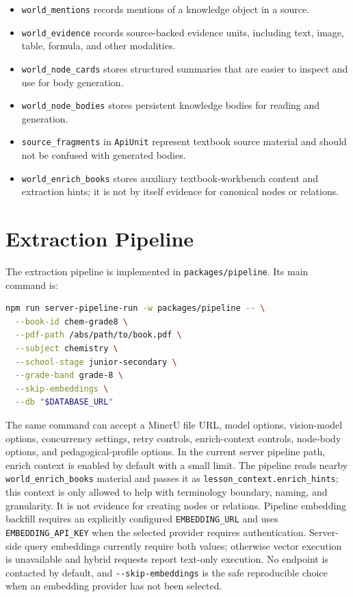 \documentclass[11pt,letterpaper]{article}
\newcommand{\code}[1]{\nolinkurl{#1}}
\begin{document}
\begin{itemize}
  \item \code{world_mentions} records mentions of a knowledge object in a source.
  \item \code{world_evidence} records source-backed evidence units, including text, image, table, formula, and other modalities.
  \item \code{world_node_cards} stores structured summaries that are easier to inspect and use for body generation.
  \item \code{world_node_bodies} stores persistent knowledge bodies for reading and generation.
  \item \code{source_fragments} in \code{ApiUnit} represent textbook source material and should not be confused with generated bodies.
  \item \code{world_enrich_books} stores auxiliary textbook-workbench content and extraction hints; it is not by itself evidence for canonical nodes or relations.
\end{itemize}

\section{Extraction Pipeline}

The extraction pipeline is implemented in \code{packages/pipeline}. Its main command is:

\begin{lstlisting}[language=bash]
npm run server-pipeline-run -w packages/pipeline -- \
  --book-id chem-grade8 \
  --pdf-path /abs/path/to/book.pdf \
  --subject chemistry \
  --school-stage junior-secondary \
  --grade-band grade-8 \
  --skip-embeddings \
  --db "$DATABASE_URL"
\end{lstlisting}

The same command can accept a MinerU file URL, model options, vision-model options, concurrency settings, retry controls, enrich-context controls, node-body options, and pedagogical-profile options. In the current server pipeline path, enrich context is enabled by default with a small limit. The pipeline reads nearby \code{world_enrich_books} material and passes it as \code{lesson_context.enrich_hints}; this context is only allowed to help with terminology boundary, naming, and granularity. It is not evidence for creating nodes or relations. Pipeline embedding backfill requires an explicitly configured \code{EMBEDDING_URL} and uses \code{EMBEDDING_API_KEY} when the selected provider requires authentication. Server-side query embeddings currently require both values; otherwise vector execution is unavailable and hybrid requests report text-only execution. No endpoint is contacted by default, and \code{--skip-embeddings} is the safe reproducible choice when an embedding provider has not been selected.
\end{document}
